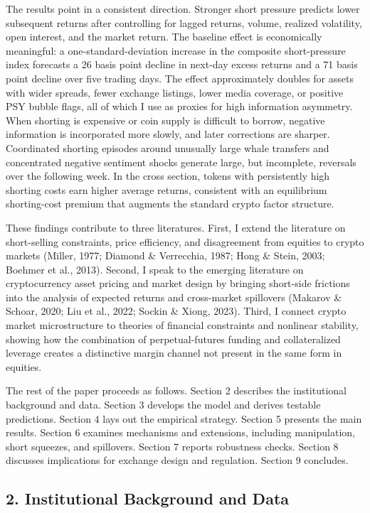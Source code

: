 \documentclass[
]{article}
\begin{document}
The results point in a consistent direction. Stronger short pressure
predicts lower subsequent returns after controlling for lagged returns,
volume, realized volatility, open interest, and the market return. The
baseline effect is economically meaningful: a one-standard-deviation
increase in the composite short-pressure index forecasts a 26 basis
point decline in next-day excess returns and a 71 basis point decline
over five trading days. The effect approximately doubles for assets with
wider spreads, fewer exchange listings, lower media coverage, or
positive PSY bubble flags, all of which I use as proxies for high
information asymmetry. When shorting is expensive or coin supply is
difficult to borrow, negative information is incorporated more slowly,
and later corrections are sharper. Coordinated shorting episodes around
unusually large whale transfers and concentrated negative sentiment
shocks generate large, but incomplete, reversals over the following
week. In the cross section, tokens with persistently high shorting costs
earn higher average returns, consistent with an equilibrium
shorting-cost premium that augments the standard crypto factor
structure.

These findings contribute to three literatures. First, I extend the
literature on short-selling constraints, price efficiency, and
disagreement from equities to crypto markets (Miller, 1977; Diamond \&
Verrecchia, 1987; Hong \& Stein, 2003; Boehmer et al., 2013). Second, I
speak to the emerging literature on cryptocurrency asset pricing and
market design by bringing short-side frictions into the analysis of
expected returns and cross-market spillovers (Makarov \& Schoar, 2020;
Liu et al., 2022; Sockin \& Xiong, 2023). Third, I connect crypto market
microstructure to theories of financial constraints and nonlinear
stability, showing how the combination of perpetual-futures funding and
collateralized leverage creates a distinctive margin channel not present
in the same form in equities.

The rest of the paper proceeds as follows. Section 2 describes the
institutional background and data. Section 3 develops the model and
derives testable predictions. Section 4 lays out the empirical strategy.
Section 5 presents the main results. Section 6 examines mechanisms and
extensions, including manipulation, short squeezes, and spillovers.
Section 7 reports robustness checks. Section 8 discusses implications
for exchange design and regulation. Section 9 concludes.

\subsection{2. Institutional Background and
Data}\label{2-institutional-background-and-data}
\end{document}
